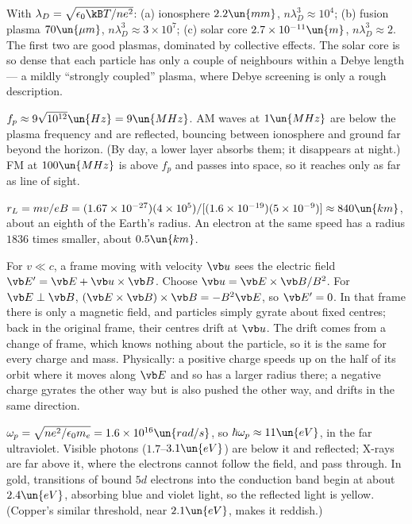 
 With $\lambda_D = \sqrt{\epsilon_0\kB T/ne^2}$: (a) ionosphere $2.2\un{mm}$, $n\lambda_D^3\approx10^4$; (b) fusion plasma $70\un{\mu m}$, $n\lambda_D^3\approx3\times10^7$; (c) solar core $2.7\times10^{-11}\un{m}$, $n\lambda_D^3\approx2$. The first two are good plasmas, dominated by collective effects. The solar core is so dense that each particle has only a couple of neighbours within a Debye length --- a mildly ``strongly coupled'' plasma, where Debye screening is only a rough description.

 $f_p\approx9\sqrt{10^{12}}\un{Hz} = 9\un{MHz}$. AM waves at $1\un{MHz}$ are below the plasma frequency and are reflected, bouncing between ionosphere and ground far beyond the horizon. (By day, a lower layer absorbs them; it disappears at night.) FM at $100\un{MHz}$ is above $f_p$ and passes into space, so it reaches only as far as line of sight.

 $r_L = mv/eB = (1.67\times10^{-27})(4\times10^5)/[(1.6\times10^{-19})(5\times10^{-9})]\approx840\un{km}$, about an eighth of the Earth's radius. An electron at the same speed has a radius $1836$ times smaller, about $0.5\un{km}$.

 For $v\ll c$, a frame moving with velocity $\vb u$ sees the electric field $\vb E' = \vb E + \vb u\times\vb B$. Choose $\vb u = \vb E\times\vb B/B^2$. For $\vb E\perp\vb B$, $(\vb E\times\vb B)\times\vb B = -B^2\vb E$, so $\vb E' = 0$. In that frame there is only a magnetic field, and particles simply gyrate about fixed centres; back in the original frame, their centres drift at $\vb u$. The drift comes from a change of frame, which knows nothing about the particle, so it is the same for every charge and mass. Physically: a positive charge speeds up on the half of its orbit where it moves along $\vb E$ and so has a larger radius there; a negative charge gyrates the other way but is also pushed the other way, and drifts in the same direction.

 $\omega_p = \sqrt{ne^2/\epsilon_0m_e} = 1.6\times10^{16}\un{rad/s}$, so $\hbar\omega_p\approx11\un{eV}$, in the far ultraviolet. Visible photons ($1.7$--$3.1\un{eV}$) are below it and reflected; X-rays are far above it, where the electrons cannot follow the field, and pass through. In gold, transitions of bound $5d$ electrons into the conduction band begin at about $2.4\un{eV}$, absorbing blue and violet light, so the reflected light is yellow. (Copper's similar threshold, near $2.1\un{eV}$, makes it reddish.)

